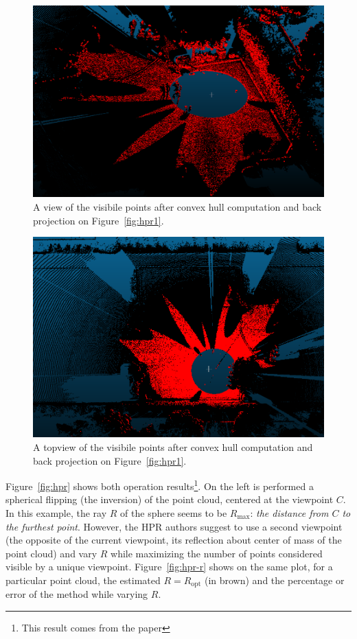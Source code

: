 \begin{figure}
  \centering
  \includegraphics[scale=0.45]{img/hpr3.png}
  \caption{A view of the visibile points after convex hull computation and back projection on Figure~\ref{fig:hpr1}.}
  \label{fig:hpr3}
\end{figure}
\begin{figure}
  \centering
  \includegraphics[scale=0.6]{img/hpr4.png}
  \caption{A topview of the visibile points after convex hull computation and back projection on Figure~\ref{fig:hpr1}.}
  \label{fig:hpr4}
\end{figure}


Figure~\ref{fig:hpr} shows both operation results\footnote{This result comes from the paper}. On the left is performed a spherical flipping (the inversion) of the point cloud, centered at the viewpoint $C$. In this example, the ray $R$ of the sphere seems to be $R_\text{max}$: \emph{the distance from $C$ to the furthest point}. However, the HPR authors suggest to use a second viewpoint (the opposite of the current viewpoint, its reflection about center of mass of the point cloud) and vary $R$ while maximizing the number of points considered visible by a unique viewpoint. Figure~\ref{fig:hpr-r} shows on the same plot, for a particular point cloud, the estimated $R=R_\text{opt}$ (in brown) and the percentage or error of the method while varying $R$.

